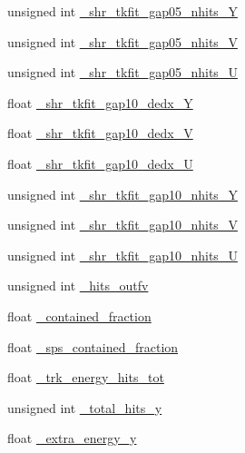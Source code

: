 \begin{DoxyCompactItemize}
unsigned int \hyperlink{classselection_1_1CC0piNpSelection_a91054bcbcb38dd0684fe810167c7146f}{\+\_\+shr\+\_\+tkfit\+\_\+gap05\+\_\+nhits\+\_\+Y}
\item 
unsigned int \hyperlink{classselection_1_1CC0piNpSelection_a515d1b21ecb57c0177501823b5ec2568}{\+\_\+shr\+\_\+tkfit\+\_\+gap05\+\_\+nhits\+\_\+V}
\item 
unsigned int \hyperlink{classselection_1_1CC0piNpSelection_a06b5781f09cf3c5129efad982fa3c210}{\+\_\+shr\+\_\+tkfit\+\_\+gap05\+\_\+nhits\+\_\+U}
\item 
float \hyperlink{classselection_1_1CC0piNpSelection_ae4ccdcc53f1b3e72cb360af8af316eb8}{\+\_\+shr\+\_\+tkfit\+\_\+gap10\+\_\+dedx\+\_\+Y}
\item 
float \hyperlink{classselection_1_1CC0piNpSelection_adf21374d01634ceeb71cdcb954c40b98}{\+\_\+shr\+\_\+tkfit\+\_\+gap10\+\_\+dedx\+\_\+V}
\item 
float \hyperlink{classselection_1_1CC0piNpSelection_a3b32a837b2388327cee3eb07ad25a557}{\+\_\+shr\+\_\+tkfit\+\_\+gap10\+\_\+dedx\+\_\+U}
\item 
unsigned int \hyperlink{classselection_1_1CC0piNpSelection_ac4f7286273aa34122aa80e6dbf34b9f7}{\+\_\+shr\+\_\+tkfit\+\_\+gap10\+\_\+nhits\+\_\+Y}
\item 
unsigned int \hyperlink{classselection_1_1CC0piNpSelection_a1dac5397a17c360ce67831fa3ed8aed5}{\+\_\+shr\+\_\+tkfit\+\_\+gap10\+\_\+nhits\+\_\+V}
\item 
unsigned int \hyperlink{classselection_1_1CC0piNpSelection_ae639e53ae1ea9c2bed506ca5d2e5c486}{\+\_\+shr\+\_\+tkfit\+\_\+gap10\+\_\+nhits\+\_\+U}
\item 
unsigned int \hyperlink{classselection_1_1CC0piNpSelection_ac39ec79d190fb925f8d20b03cbeb0605}{\+\_\+hits\+\_\+outfv}
\item 
float \hyperlink{classselection_1_1CC0piNpSelection_a8e7933222bce1424aee24bae8dcf4864}{\+\_\+contained\+\_\+fraction}
\item 
float \hyperlink{classselection_1_1CC0piNpSelection_ac425fa284847d7cae95f21367ed4889e}{\+\_\+sps\+\_\+contained\+\_\+fraction}
\item 
float \hyperlink{classselection_1_1CC0piNpSelection_a82a48c6128c34252642d237b98f1b66a}{\+\_\+trk\+\_\+energy\+\_\+hits\+\_\+tot}
\item 
unsigned int \hyperlink{classselection_1_1CC0piNpSelection_a819d1d973e74bcd2ad82aa01ea24ac37}{\+\_\+total\+\_\+hits\+\_\+y}
\item 
float \hyperlink{classselection_1_1CC0piNpSelection_a2e386c361ecc27d22ff2642e80a629e4}{\+\_\+extra\+\_\+energy\+\_\+y}
\end{DoxyCompactItemize}
